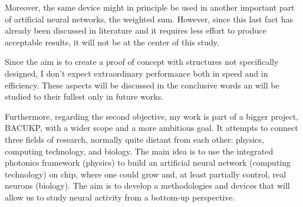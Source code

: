 
Moreover, the same device might in principle be used in another important part of artificial neural networks, the weighted sum.
However, since this last fact has already been discussed in literature and it requires less effort to produce acceptable results, it will not be at the center of this study.

Since the aim is to create a proof of concept with structures not specifically designed, I don't expect extraordinary performance both in speed and in efficiency.
These aspects will be discussed in the conclusive words an will be studied to their fullest only in future works.

Furthermore, regarding the second objective, my work is part of a bigger project, BACUKP, with a wider scope and a more ambitious goal.
It attempts to connect three fields of research, normally quite distant from each other: physics, computing technology, and biology.
The main idea is to use the integrated photonics framework (physics) to build an artificial neural network (computing technology) on chip, where one could grow and, at least partially control, real neurons (biology).
The aim is to develop a methodologies and devices that will allow us to study neural activity from a bottom-up perspective.

